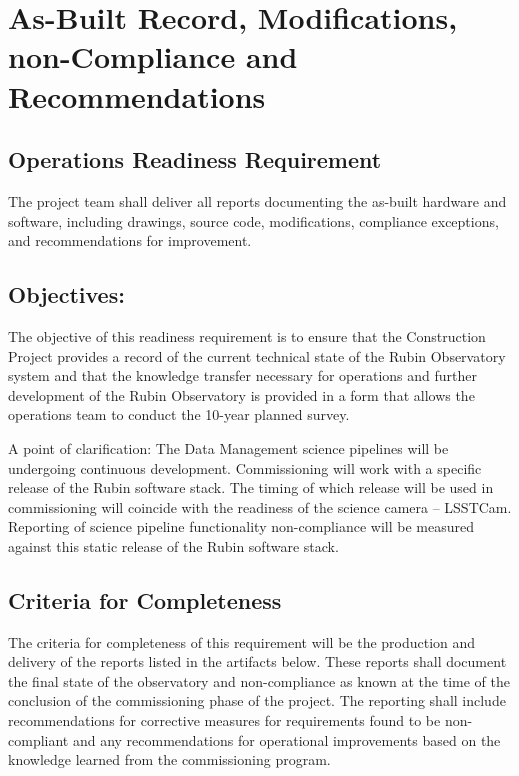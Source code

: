 \section{As-Built Record, Modifications, non-Compliance and Recommendations} \label{sec:recs}

\subsection{Operations Readiness Requirement}

The project team shall deliver all reports documenting the as-built hardware and software, including drawings, source code, modifications, compliance exceptions, and recommendations for improvement.

\subsection{Objectives:}

The objective of this readiness requirement is to ensure that the Construction Project provides a record of the current technical state of the Rubin Observatory system and that the knowledge transfer necessary for operations and further development of the Rubin Observatory is provided in a form that allows the operations team to conduct the 10-year planned survey.

A point of clarification: The Data Management science pipelines will be undergoing continuous development.  Commissioning will work with a specific release of the Rubin software stack.  The timing of which release will be used in commissioning will coincide with the readiness of the science camera -- LSSTCam.  Reporting of science pipeline functionality non-compliance will be measured against this static release of the Rubin software stack.

\subsection{Criteria for Completeness}

The criteria for completeness of this requirement will be the production and delivery of the reports listed in the artifacts below.  These reports shall document the final state of the observatory and non-compliance as known at the time of the conclusion of the commissioning phase of the project.  The reporting shall include recommendations for corrective measures for requirements found to be non-compliant and any recommendations for operational improvements based on the knowledge learned from the commissioning program.

